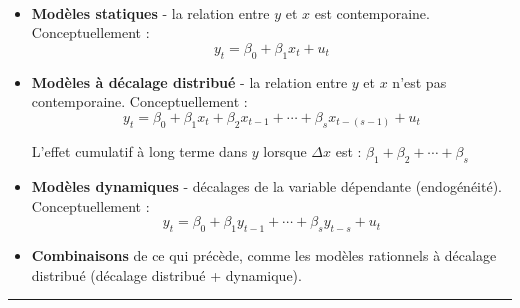 	\begin{f}{\ }
		

	\begin{itemize}[leftmargin=*]
		\item \textbf{Modèles statiques} - la relation entre \(y\) et \(x\) est contemporaine. Conceptuellement :
\[y_{t} = \beta_{0} + \beta_{1} x_{t} + u_{t}\]
		
		\item \textbf{Modèles à décalage distribué} - la relation entre \(y\) et \(x\) n'est pas contemporaine. Conceptuellement :
\[y_{t} = \beta_{0} + \beta_{1} x_{t} + \beta_{2} x_{t - 1} + \cdots + \beta_{s} x_{t - (s - 1)} + u_{t}\]
		
		L'effet cumulatif à long terme dans \(y\) lorsque \(\Delta x\) est :
			\(\beta_{1} + \beta_{2} + \cdots + \beta_{s}\)
		
		\item \textbf{Modèles dynamiques} - décalages de la variable dépendante (endogénéité). Conceptuellement :
\[y_{t} = \beta_{0} + \beta_{1} y_{t - 1} + \cdots + \beta_{s} y_{t - s} + u_{t}\]
		
		\item \textbf{Combinaisons} de ce qui précède, comme les modèles rationnels à décalage distribué (décalage distribué + dynamique).
	\end{itemize}	

\end{f} 
 \hrule 
 
